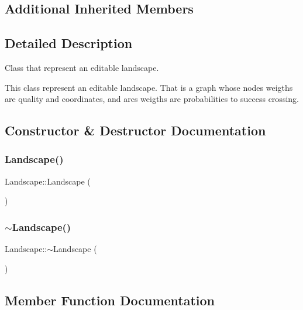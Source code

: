 \subsection*{Additional Inherited Members}


\subsection{Detailed Description}
Class that represent an editable landscape. 

This class represent an editable landscape. That is a graph whose nodes weigths are quality and coordinates, and arcs weigths are probabilities to success crossing. 

\subsection{Constructor \& Destructor Documentation}
\mbox{\label{class_landscape_a0a54d8aabc38c0a5aa27ccace3f91915}} 
\subsubsection{\texorpdfstring{Landscape()}{Landscape()}}
{\footnotesize\ttfamily Landscape\+::\+Landscape (\begin{DoxyParamCaption}{ }\end{DoxyParamCaption})}

\mbox{\label{class_landscape_a44c62eb1b0f84a40f25b9a6445c8b130}} 
\subsubsection{\texorpdfstring{$\sim$\+Landscape()}{~Landscape()}}
{\footnotesize\ttfamily Landscape\+::$\sim$\+Landscape (\begin{DoxyParamCaption}{ }\end{DoxyParamCaption})}



\subsection{Member Function Documentation}
\mbox{\label{class_landscape_a838233aa09155408cd938405aa504289}} 
